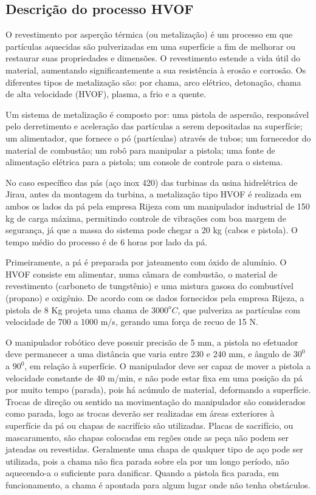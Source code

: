 \subsection{Descrição do processo HVOF}
\label{desc_hvof}
O revestimento por asperção térmica (ou metalização) é um processo em que
partículas aquecidas são pulverizadas em uma superfície a fim de melhorar ou
restaurar suas propriedades e dimensões. O revestimento estende a vida útil do
material, aumentando significantemente a sua resistência à erosão e corrosão.
Os diferentes tipos de metalização são: por chama, arco elétrico, detonação,
chama de alta velocidade (HVOF), plasma, a frio e a quente.

Um sistema de metalização é composto por: uma pistola de aspersão, responsável
pelo derretimento e aceleração das partículas a serem depositadas na
superfície; um alimentador, que fornece o pó (partículas) através de tubos;
um fornecedor do material de combustão; um robô para manipular a pistola; uma
fonte de alimentação elétrica para a pistola; um console de controle para o
sistema.

No caso específico das pás (aço inox 420) das turbinas da usina hidrelétrica de
Jirau, antes da montagem da turbina, a metalização tipo HVOF é realizada em
ambos os lados da pá pela empresa Rijeza com um manipulador industrial de 150 kg
de carga máxima, permitindo controle de vibrações com boa margem de segurança, já que a massa do
sistema pode chegar a 20 kg (cabos e pistola). O tempo
médio do processo é de 6 horas por lado da pá.

Primeiramente, a pá é preparada por jateamento com óxido de alumínio. O HVOF
consiste em alimentar, numa câmara de combustão, o material de revestimento
(carboneto de tungstênio) e uma mistura gasosa do combustível (propano) e
oxigênio. De acordo com os dados fornecidos pela empresa Rijeza, a pistola de 8
Kg projeta uma chama de $3000^oC$, que pulveriza as partículas com velocidade de
700 a 1000 m/s, gerando uma força de recuo de 15 N.

O manipulador robótico deve possuir precisão de 5 mm, a pistola no efetuador
deve permanecer a uma distância que varia entre 230 e 240 mm, e ângulo de $30^0$
a $90^0$, em relação à superfície. O manipulador deve ser capaz de mover a
pistola a velocidade constante de 40 m/min, e não pode estar fixa em uma posição
da pá por muito tempo (parada), pois há acúmulo de material, deformando a
superfície. Trocas de direção ou sentido na movimentação do manipulador são
considerados como parada, logo as trocas deverão ser realizadas em áreas
exteriores à superfície da pá ou chapas de sacrifício são utilizadas. Placas de
sacrifício, ou mascaramento, são chapas colocadas em regões onde as peça não
podem ser jateadas ou revestidas. Geralmente uma chapa de qualquer tipo de aço
pode ser utilizada, pois a chama não fica parada sobre ela por um longo período,
não aquecendo-a o suficiente para danificar. Quando a pistola fica parada, em
funcionamento, a chama é apontada para algum lugar onde não tenha obstáculos.

